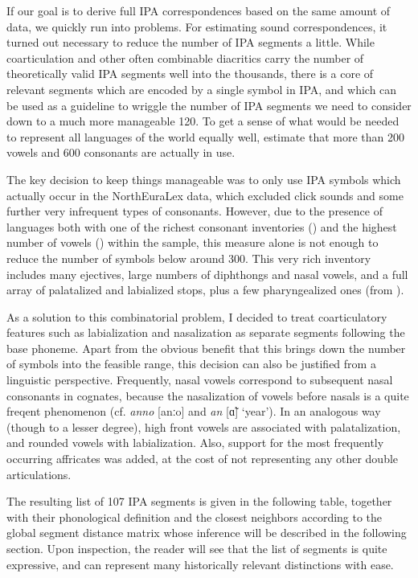 If our goal is to derive full IPA correspondences based on the same amount of data, we quickly run into problems. For estimating sound correspondences, it turned out necessary to reduce the number of IPA segments a little. While coarticulation and other often combinable diacritics carry the number of theoretically valid IPA segments well into the thousands, there is a core of relevant segments which are encoded by a single symbol in IPA, and which can be used as a guideline to wriggle the number of IPA segments we need to consider down to a much more manageable 120. To get a sense of what would be needed to represent all languages of the world equally well, \cite{ladefoged_maddieson_1996} estimate that more than 200 vowels and 600 consonants are actually in use.

The key decision to keep things manageable was to only use IPA symbols which actually occur in the NorthEuraLex data, which excluded click sounds and some further very infrequent types of consonants. However, due to the presence of languages both with one of the richest consonant inventories () and the highest number of vowels () within the sample, this measure alone is not enough to reduce the number of symbols below around 300. This very rich inventory includes many ejectives, large numbers of diphthongs and nasal vowels, and a full array of palatalized and labialized stops, plus a few pharyngealized ones (from ).

As a solution to this combinatorial problem, I decided to treat coarticulatory features such as labialization and nasalization as separate segments following the base phoneme. Apart from the obvious benefit that this brings down the number of symbols into the feasible range, this decision can also be justified from a linguistic perspective. Frequently, nasal vowels correspond to subsequent nasal consonants in cognates, because the nasalization of vowels before nasals is a quite freqent phenomenon (cf.  \textit{anno} [anːo] and  \textit{an} [ɑ̃] `year'). In an analogous way (though to a lesser degree), high front vowels are associated with palatalization, and rounded vowels with labialization. Also, support for the most frequently occurring affricates was added, at the cost of not representing any other double articulations.

The resulting list of 107 IPA segments is given in the following table, together with their phonological definition and the closest neighbors according to the global segment distance matrix whose inference will be described in the following section. Upon inspection, the reader will see that the list of segments is quite expressive, and can represent many historically relevant distinctions with ease.

